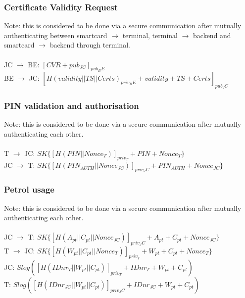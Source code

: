 \subsubsection{Certificate Validity Request}
Note: this is considered to be done via a secure communication after mutually authenticating between smartcard $\to$ terminal, terminal $\to$ backend and smartcard $\to$ backend through terminal.
\\
\\
JC $\to$ BE: $[CVR + pub_{JC}]_{pub_BE}$\\
BE $\to$ JC: $[H(validity||TS||Certs)_{priv_BE}+validity+TS+Certs]_{pub_JC}$\\

\subsubsection{PIN validation and authorisation}
Note: this is considered to be done via a secure communication after mutually authenticating each other.
\\
\\
T $\to$ JC: $SK\{[H(PIN||Nonce_{T})]_{priv_T}+PIN+Nonce_{T}\}$\\
JC $\to$ T: $SK\{[H(PIN_{AUTH}||Nonce_{JC})]_{priv_JC}+PIN_{AUTH}+Nonce_{JC}\}$\\

\subsubsection{Petrol usage}
Note: this is considered to be done via a secure communication after mutually authenticating each other.
\\
\\
JC $\to$ T: $SK\{[H(A_{pt}||C_{pt}||Nonce_{JC})]_{priv_JC}+A_{pt}+C_{pt}+Nonce_{JC}\}$\\
T $\to$ JC: $SK\{[H(W_{pt}||C_{pt}||Nonce_{T})]_{priv_T}+W_{pt}+C_{pt}+Nonce_{T}\}$\\
JC: $Slog([H(IDnr_{T}||W_{pt}||C_{pt})]_{priv_T}+IDnr_{T}+W_{pt}+C_{pt})$\\
T: $Slog([H(IDnr_{JC}||W_{pt}||C_{pt})]_{priv_JC}+IDnr_{JC}+W_{pt}+C_{pt})$\\
